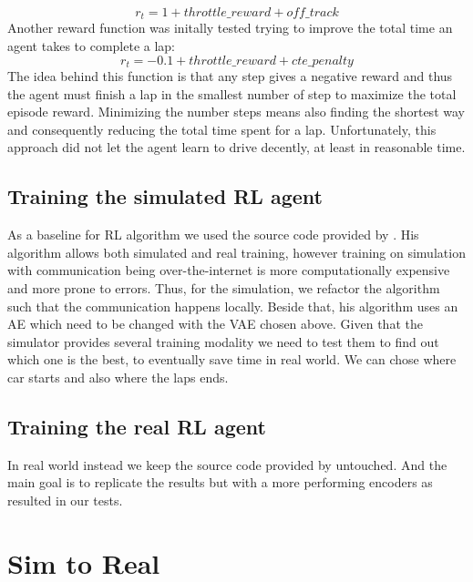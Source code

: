 \begin{equation}
  \label{eq:realreward}
  r_t = 1 + throttle\_reward + off\_track
\end{equation}
Another reward function was initally tested trying to improve the total time an agent takes to complete a lap:
\begin{equation}
  \label{eq:testreward}
  r_t = - 0.1 + throttle\_reward + cte\_penalty
\end{equation}
The idea behind this function is that any step gives a negative reward and thus the agent must finish a lap in the smallest number of step to maximize the total episode reward. Minimizing the number steps means also finding the shortest way and consequently reducing the total time spent for a lap. Unfortunately, this approach did not let the agent learn to drive decently, at least in reasonable time.

\subsection{Training the simulated RL agent}
As a baseline for RL algorithm we used the source code provided by \citet{DBLP:journals/corr/abs-2008-00715}. His algorithm allows both simulated and real training, however training on simulation with communication being over-the-internet is more computationally expensive and more prone to errors. Thus, for the simulation, we refactor the algorithm such that the communication happens locally. Beside that, his algorithm uses an AE which need to be changed with the VAE chosen above. Given that the simulator provides several training modality we need to test them to find out which one is the best, to eventually save time in real world. We can chose where car starts and also where the laps ends. 


\subsection{Training the real RL agent}
In real world instead we keep the source code provided by \citet{DBLP:journals/corr/abs-2008-00715} untouched. And the main goal is to replicate the results but with a more performing encoders as resulted in our tests. 

\section{Sim to Real}